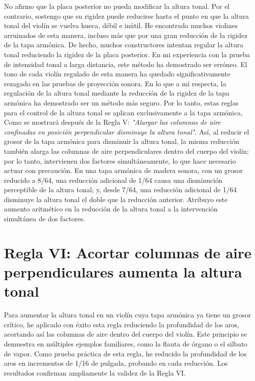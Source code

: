 \documentclass[12pt]{book}
\begin{document}
No afirmo que la placa posterior no pueda modificar la altura tonal. Por el contrario, sostengo que su rigidez puede reducirse hasta el punto en que la altura tonal del violín se vuelva hueca, débil e inútil. He encontrado muchos violines arruinados de esta manera, incluso más que por una gran reducción de la rigidez de la tapa armónica. De hecho, muchos constructores intentan regular la altura tonal reduciendo la rigidez de la placa posterior. En mi experiencia con la prueba de intensidad tonal a larga distancia, este método ha demostrado ser erróneo. El tono de cada violín regulado de esta manera ha quedado significativamente rezagado en las pruebas de proyección sonora. En lo que a mí respecta, la regulación de la altura tonal mediante la reducción de la rigidez de la tapa armónica ha demostrado ser un método más seguro. Por lo tanto, estas reglas para el control de la altura tonal se aplican exclusivamente a la tapa armónica, Como se mostrará después de la Regla V: \textit{"Alargar las columnas de aire confinadas en posición perpendicular disminuye la altura tonal"}. Así, al reducir el grosor de la tapa armónica para disminuir la altura tonal, la misma reducción también alarga las columnas de aire perpendiculares dentro del cuerpo del violín; por lo tanto, intervienen dos factores simultáneamente, lo que hace necesario actuar con precaución. En una tapa armónica de madera sonora, con un grosor reducido a 8/64, una reducción adicional de 1/64 causa una disminución perceptible de la altura tonal; y, desde 7/64, una reducción adicional de 1/64 disminuye la altura tonal el doble que la reducción anterior. Atribuyo este aumento aritmético en la reducción de la altura tonal a la intervención simultánea de dos factores.

\section*{Regla VI: Acortar columnas de aire perpendiculares aumenta la altura tonal}

Para aumentar la altura tonal en un violín cuya tapa armónica ya tiene un grosor crítico, he aplicado con éxito esta regla reduciendo la profundidad de los aros, acortando así las columnas de aire dentro del cuerpo del violín. Este principio se demuestra en múltiples ejemplos familiares, como la flauta de órgano o el silbato de vapor. Como prueba práctica de esta regla, he reducido la profundidad de los aros en incrementos de 1/16 de pulgada, probando en cada reducción. Los resultados confirman ampliamente la validez de la Regla VI.
\end{document}
